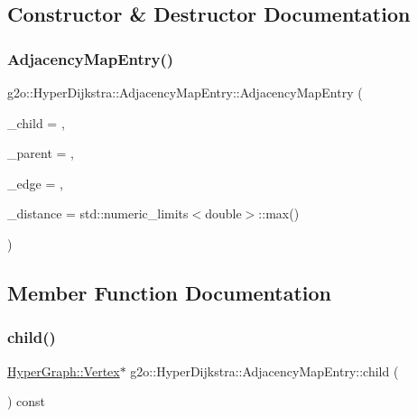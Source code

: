 \subsection{Constructor \& Destructor Documentation}
\mbox{\label{structg2o_1_1_hyper_dijkstra_1_1_adjacency_map_entry_a160f87d80b7c2137abcce561fbc5feed}} 
\subsubsection{\texorpdfstring{Adjacency\+Map\+Entry()}{AdjacencyMapEntry()}}
{\footnotesize\ttfamily g2o\+::\+Hyper\+Dijkstra\+::\+Adjacency\+Map\+Entry\+::\+Adjacency\+Map\+Entry (\begin{DoxyParamCaption}\item[{\mbox{\hyperlink{classg2o_1_1_hyper_graph_1_1_vertex}{Hyper\+Graph\+::\+Vertex}} $\ast$}]{\+\_\+child = {},  }\item[{\mbox{\hyperlink{classg2o_1_1_hyper_graph_1_1_vertex}{Hyper\+Graph\+::\+Vertex}} $\ast$}]{\+\_\+parent = {},  }\item[{\mbox{\hyperlink{classg2o_1_1_hyper_graph_1_1_edge}{Hyper\+Graph\+::\+Edge}} $\ast$}]{\+\_\+edge = {},  }\item[{double}]{\+\_\+distance = {\ttfamily std\+:\+:numeric\+\_\+limits$<$double$>$\+:\+:max()} }\end{DoxyParamCaption})}



\subsection{Member Function Documentation}
\mbox{\label{structg2o_1_1_hyper_dijkstra_1_1_adjacency_map_entry_a2db2f9eaa364a04f07c81c70784f2193}} 
\subsubsection{\texorpdfstring{child()}{child()}}
{\footnotesize\ttfamily \mbox{\hyperlink{classg2o_1_1_hyper_graph_1_1_vertex}{Hyper\+Graph\+::\+Vertex}}$\ast$ g2o\+::\+Hyper\+Dijkstra\+::\+Adjacency\+Map\+Entry\+::child (\begin{DoxyParamCaption}{ }\end{DoxyParamCaption}) const\hspace{0.3cm}{\ttfamily [inline]}}

